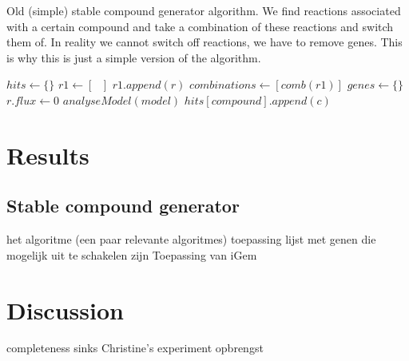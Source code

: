 \documentclass[12pt]{report}
\begin{document}
\begin{algorithm}
  \caption{Old (simple) stable compound generator algorithm. We find reactions associated with a certain compound and take a combination of these reactions and switch them of. In reality we cannot switch off reactions, we have to remove genes. This is why this is just a simple version of the algorithm.}\label{alg:scg_old}
  \begin{algorithmic}[1]
        \State $hits \gets \text{\{ \}}$
        \State $r1 \gets [\text{ }]$ 
                \State $r1.append(r)$
            \EndIf
        \EndFor
            \State $combinations \gets [comb(r1)]$
            \State $genes \gets \text{\{ \}}$
                    \State $r.flux \gets 0$
                \EndFor
                \State $analyseModel(model)$
                        \State $hits[compound].append(c)$
                    \EndIf
                \EndIf
            \EndFor
        \EndIf
    \EndProcedure
  \end{algorithmic}
\end{algorithm}



\section{Results}
\subsection{Stable compound generator}
het algoritme (een paar relevante algoritmes)
toepassing lijst met genen die mogelijk uit te schakelen zijn
Toepassing van iGem

\section{Discussion}
completeness
sinks
Christine's experiment
opbrengst
\end{document}
